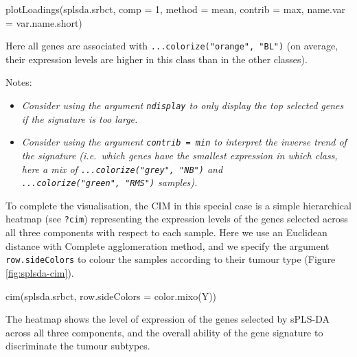 \documentclass[
]{book}
\newenvironment{Shaded}{\begin{snugshade}}{\end{snugshade}}
\newcommand{\AttributeTok}[1]{\textcolor[rgb]{0.77,0.63,0.00}{#1}}
\newcommand{\DecValTok}[1]{\textcolor[rgb]{0.00,0.00,0.81}{#1}}
\newcommand{\FunctionTok}[1]{\textcolor[rgb]{0.00,0.00,0.00}{#1}}
\newcommand{\NormalTok}[1]{#1}
\newcommand{\StringTok}[1]{\textcolor[rgb]{0.31,0.60,0.02}{#1}}
\providecommand{\tightlist}{%
  \setlength{\itemsep}{0pt}\setlength{\parskip}{0pt}}
\begin{document}
\begin{Shaded}
\begin{Highlighting}[]
\FunctionTok{plotLoadings}\NormalTok{(splsda.srbct, }\AttributeTok{comp =} \DecValTok{1}\NormalTok{, }\AttributeTok{method =} \StringTok{\textquotesingle{}mean\textquotesingle{}}\NormalTok{, }\AttributeTok{contrib =} \StringTok{\textquotesingle{}max\textquotesingle{}}\NormalTok{, }
             \AttributeTok{name.var =}\NormalTok{ var.name.short)}
\end{Highlighting}
\end{Shaded}



Here all genes are associated with \texttt{...colorize("orange",\ "BL")} (on average, their expression levels are higher in this class than in the other classes).

Notes:

\begin{itemize}
\tightlist
\item
  \emph{Consider using the argument \texttt{ndisplay} to only display the top selected genes if the signature is too large.}
\item
  \emph{Consider using the argument \texttt{contrib\ =\ \textquotesingle{}min\textquotesingle{}} to interpret the inverse trend of the signature (i.e.~which genes have the smallest expression in which class, here a mix of \texttt{...colorize("grey",\ "NB")} and \texttt{...colorize("green",\ "RMS")} samples).}
\end{itemize}

To complete the visualisation, the CIM in this special case is a simple hierarchical heatmap (see \texttt{?cim}) representing the expression levels of the genes selected across all three components with respect to each sample. Here we use an Euclidean distance with Complete agglomeration method, and we specify the argument \texttt{row.sideColors} to colour the samples according to their tumour type (Figure \ref{fig:splsda-cim}).

\begin{Shaded}
\begin{Highlighting}[]
\FunctionTok{cim}\NormalTok{(splsda.srbct, }\AttributeTok{row.sideColors =} \FunctionTok{color.mixo}\NormalTok{(Y))}
\end{Highlighting}
\end{Shaded}



The heatmap shows the level of expression of the genes selected by sPLS-DA across all three components, and the overall ability of the gene signature to discriminate the tumour subtypes.
\end{document}
